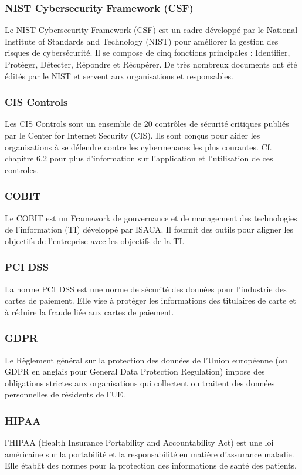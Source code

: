 \subsubsection{NIST Cybersecurity Framework (CSF)}
Le NIST Cybersecurity Framework (CSF) est un cadre développé par le National Institute of Standards and Technology (NIST) pour améliorer la gestion des risques de cybersécurité. Il se compose de cinq fonctions principales : Identifier, Protéger, Détecter, Répondre et Récupérer. De très nombreux documents ont été édités par le NIST et servent aux organisations et responsables.
	
\subsubsection{CIS Controls}
Les CIS Controls sont un ensemble de 20 contrôles de sécurité critiques publiés par le Center for Internet Security (CIS). Ils sont conçus pour aider les organisations à se défendre contre les cybermenaces les plus courantes. Cf. chapitre 6.2 pour plus d'information sur l'application et l'utilisation de ces controles.
	
\subsubsection{COBIT}
Le COBIT est un Framework de gouvernance et de management des technologies de l'information (TI) développé par ISACA. Il fournit des outils pour aligner les objectifs de l'entreprise avec les objectifs de la TI.
	
\subsubsection{PCI DSS}
La norme PCI DSS est une norme de sécurité des données pour l'industrie des cartes de paiement. Elle vise à protéger les informations des titulaires de carte et à réduire la fraude liée aux cartes de paiement.
	
\subsubsection{GDPR}
Le Règlement général sur la protection des données de l'Union européenne (ou GDPR en anglais pour General Data Protection Regulation) impose des obligations strictes aux organisations qui collectent ou traitent des données personnelles de résidents de l'UE.
	
\subsubsection{HIPAA}
l'HIPAA (Health Insurance Portability and Accountability Act) est une loi américaine sur la portabilité et la responsabilité en matière d'assurance maladie. Elle établit des normes pour la protection des informations de santé des patients.
	
